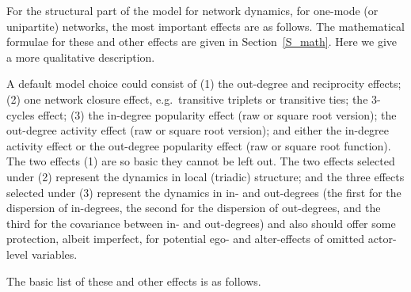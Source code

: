 \documentclass[a4paper,fleqn]{article}
\newcommand{\+}{\, + \,}
\begin{document}
{For the structural part of the model for network dynamics,
for one-mode (or unipartite) networks,
the most important effects are as follows.
The mathematical formulae for these and other effects are given
in Section~\ref{S_math}. Here we give a more qualitative description.

A default model choice could consist of (1) the out-degree and reciprocity
effects; (2) one network closure effect,
e.g.\ transitive triplets or transitive ties; the 3-cycles effect;
(3) the in-degree popularity effect (raw or square root version);
the out-degree activity effect (raw or square root version);
and either the in-degree activity effect or the out-degree popularity effect
(raw or square root function).
The two effects (1) are so basic they cannot be left out.
The two effects selected under (2) represent the dynamics in local (triadic) structure;
and the three effects selected under (3) represent the dynamics
in in- and out-degrees (the first for the dispersion of in-degrees,
the second for the dispersion of out-degrees, and the third for the
covariance between in- and out-degrees) and also should offer
some protection, albeit imperfect, for potential ego- and alter-effects
of omitted actor-level variables.

The basic list of these and other effects is as follows.

}
\end{document}
